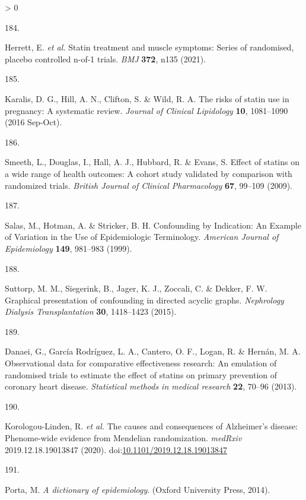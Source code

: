 \documentclass[a4paper, twoside]{templates/ociamthesis}
\newlength{\cslhangindent}
\newlength{\csllabelwidth}
\newenvironment{CSLReferences}[3] %
 {%
  \setlength{\parindent}{0pt}
  \ifodd #1 \everypar{\setlength{\hangindent}{\cslhangindent}}\ignorespaces\fi
  \ifnum #2 > 0
  \setlength{\parskip}{#2\baselineskip}
  \fi
 }%
 {}
\newcommand{\CSLLeftMargin}[1]{\parbox[t]{\maxof{\widthof{#1}}{\csllabelwidth}}{#1}}
\newcommand{\CSLRightInline}[1]{\parbox[t]{\linewidth - \csllabelwidth}{#1}}
\begin{document}
\begin{CSLReferences}{0}{0}
\leavevmode\hypertarget{ref-herrett2021}{}%
\CSLLeftMargin{184. }
\CSLRightInline{Herrett, E. \emph{et al.} Statin treatment and muscle symptoms: Series of randomised, placebo controlled n-of-1 trials. \emph{BMJ} \textbf{372}, n135 (2021).}

\leavevmode\hypertarget{ref-karalis2016}{}%
\CSLLeftMargin{185. }
\CSLRightInline{Karalis, D. G., Hill, A. N., Clifton, S. \& Wild, R. A. The risks of statin use in pregnancy: {A} systematic review. \emph{Journal of Clinical Lipidology} \textbf{10}, 1081--1090 (2016 Sep-Oct).}

\leavevmode\hypertarget{ref-smeeth2009}{}%
\CSLLeftMargin{186. }
\CSLRightInline{Smeeth, L., Douglas, I., Hall, A. J., Hubbard, R. \& Evans, S. Effect of statins on a wide range of health outcomes: A cohort study validated by comparison with randomized trials. \emph{British Journal of Clinical Pharmacology} \textbf{67}, 99--109 (2009).}

\leavevmode\hypertarget{ref-salas1999}{}%
\CSLLeftMargin{187. }
\CSLRightInline{Salas, M., Hotman, A. \& Stricker, B. H. Confounding by {Indication}: {An Example} of {Variation} in the {Use} of {Epidemiologic Terminology}. \emph{American Journal of Epidemiology} \textbf{149}, 981--983 (1999).}

\leavevmode\hypertarget{ref-suttorp2015}{}%
\CSLLeftMargin{188. }
\CSLRightInline{Suttorp, M. M., Siegerink, B., Jager, K. J., Zoccali, C. \& Dekker, F. W. Graphical presentation of confounding in directed acyclic graphs. \emph{Nephrology Dialysis Transplantation} \textbf{30}, 1418--1423 (2015).}

\leavevmode\hypertarget{ref-danaei2013b}{}%
\CSLLeftMargin{189. }
\CSLRightInline{Danaei, G., García Rodríguez, L. A., Cantero, O. F., Logan, R. \& Hernán, M. A. Observational data for comparative effectiveness research: An emulation of randomised trials to estimate the effect of statins on primary prevention of coronary heart disease. \emph{Statistical methods in medical research} \textbf{22}, 70--96 (2013).}

\leavevmode\hypertarget{ref-korologou-linden2020}{}%
\CSLLeftMargin{190. }
\CSLRightInline{Korologou-Linden, R. \emph{et al.} The causes and consequences of {Alzheimer}'s disease: Phenome-wide evidence from {Mendelian} randomization. \emph{medRxiv} 2019.12.18.19013847 (2020). doi:\href{https://doi.org/10.1101/2019.12.18.19013847}{10.1101/2019.12.18.19013847}}

\leavevmode\hypertarget{ref-porta2014dictionary}{}%
\CSLLeftMargin{191. }
\CSLRightInline{Porta, M. \emph{A dictionary of epidemiology}. ({Oxford University Press}, 2014).}


\end{CSLReferences}
\end{document}
